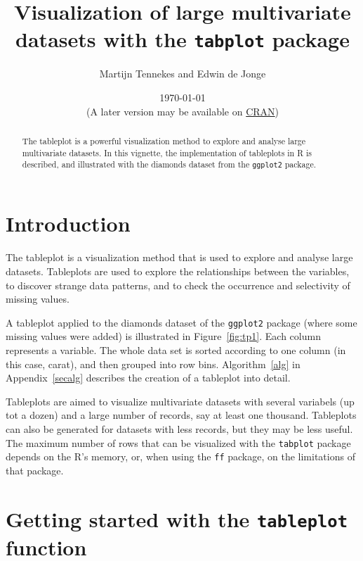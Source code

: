\documentclass[11pt, fleqn, a4paper]{article}\usepackage{graphicx, color}
\title{Visualization of large multivariate datasets with the {\tt tabplot} package}
\author{Martijn Tennekes and Edwin de Jonge}
\date{\today\\ (A later version may be available on \href{http://cran.r-project.org/package=tabplot}{CRAN})}
\begin{document}

\maketitle
\begin{abstract}

The tableplot is a powerful visualization method to explore and analyse large multivariate datasets. In this vignette, the implementation of tableplots in R is described, and illustrated with the diamonds dataset from the {\tt ggplot2} package. 


\end{abstract}



\maketitle

\newpage

\tableofcontents
\newpage
\section{Introduction}
The tableplot is a visualization method that is used to explore and analyse large datasets. Tableplots are used to explore the relationships between the variables, to discover strange data patterns, and to check the occurrence and selectivity of missing values. 

A tableplot applied to the diamonds dataset of the {\tt ggplot2} package (where some missing values were added) is illustrated in Figure~\ref{fig:tp1}. Each column represents a variable. The whole data set is sorted according to one column (in this case, carat), and then grouped into row bins. Algorithm~\ref{alg} in Appendix~\ref{secalg} describes the creation of a tableplot into detail.

Tableplots are aimed to visualize multivariate datasets with several variabels (up tot a dozen) and a large number of records, say at least one thousand. Tableplots can also be generated for datasets with less records, but they may be less useful. The maximum number of rows that can be visualized with the {\tt tabplot} package depends on the R's memory, or, when using the {\tt ff} package, on the limitations of that package.

\section{Getting started with the {\tt tableplot} function}
\end{document}
